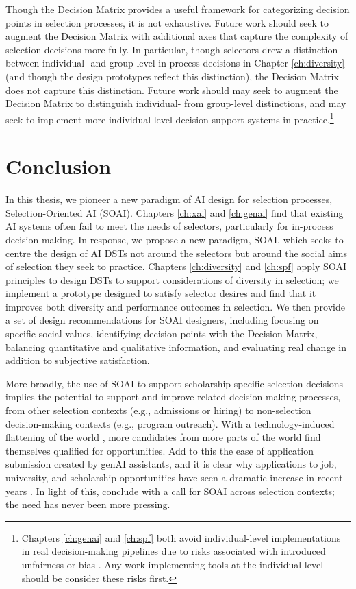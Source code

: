 Though the Decision Matrix provides a useful framework for categorizing decision points in selection processes, it is not exhaustive. Future work should seek to augment the Decision Matrix with additional axes that capture the complexity of selection decisions more fully. In particular, though selectors drew a distinction between individual- and group-level in-process decisions in Chapter \ref{ch:diversity} (and though the design prototypes reflect this distinction), the Decision Matrix does not capture this distinction. Future work should may seek to augment the Decision Matrix to distinguish individual- from group-level distinctions, and may seek to implement more individual-level decision support systems in practice.\footnote{Chapters \ref{ch:genai} and \ref{ch:spf} both avoid individual-level implementations in real decision-making pipelines due to risks associated with introduced unfairness or bias \cite{hartigan_fairness_1989,barocas2023fairness,pmlr-v80-kearns18a,Bastounis_Campodonico_vanderSchaar_Adcock_Hansen_2024,liang_gpt_2023}. Any work implementing tools at the individual-level should be consider these risks first.}

\section{Conclusion}
In this thesis, we pioneer a new paradigm of AI design for selection processes, Selection-Oriented AI (SOAI). Chapters \ref{ch:xai} and \ref{ch:genai} find that existing AI systems often fail to meet the needs of selectors, particularly for in-process decision-making. In response, we propose a new paradigm, SOAI, which seeks to centre the design of AI DSTs not around the selectors but around the social aims of selection they seek to practice. Chapters \ref{ch:diversity} and \ref{ch:spf} apply SOAI principles to design DSTs to support considerations of diversity in selection; we implement a prototype designed to satisfy selector desires and find that it improves both diversity and performance outcomes in selection. We then provide a set of design recommendations for SOAI designers, including focusing on specific social values, identifying decision points with the Decision Matrix, balancing quantitative and qualitative information, and evaluating real change in addition to subjective satisfaction.

More broadly, the use of SOAI to support scholarship-specific selection decisions implies the potential to support and improve related decision-making processes, from other selection contexts (e.g., admissions or hiring) to non-selection decision-making contexts (e.g., program outreach). With a technology-induced flattening of the world \cite{Friedman_2005}, more candidates from more parts of the world find themselves qualified for opportunities. Add to this the ease of application submission created by genAI assistants, and it is clear why applications to job, university, and scholarship opportunities have seen a dramatic increase in recent years \cite{Kaashoek2024Impact}. In light of this, conclude with a call for SOAI across selection contexts; the need has never been more pressing.